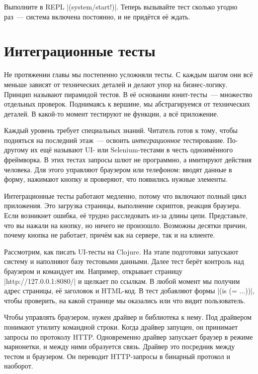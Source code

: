 Выполните в REPL \spverb|(system/start!)|. Теперь вызывайте тест сколько угодно
раз~--- система включена постоянно, и не прид\"{е}тся е\"{е} ждать.

\section{Интеграционные тесты}


Не протяжении главы мы постепенно усложняли тесты. С каждым шагом они вс\"{е}
меньше зависят от технических деталей и делают упор на бизнес-логику. Принцип
называют пирамидой тестов.
В е\"{е} основании юнит-тесты~--- множество отдельных проверок. Поднимаясь к вершине,
мы абстрагируемся от технических деталей. В какой-то момент тестируют не функции,
а вс\"{е} приложение.


Каждый уровень требует специальных знаний. Читатель готов к тому, чтобы
подняться на последний этаж~--- освоить \emph{интеграционное}
тестирование. По-другому их ещ\"{е} называют UI- или Selenium-тестами в честь
одноим\"{е}нного фреймворка. В этих тестах запросы шлют не программно, а имитируют действия
человека. Для этого управляют браузером или телефоном: вводят данные в форму,
нажимают кнопку и проверяют, что появились нужные элементы.

Интеграционные тесты работают медленно, потому что включают полный цикл
приложения. Это загрузка страницы, выполнение скриптов, реакция браузера. Если
возникнет ошибка, е\"{е} трудно расследовать из-за длины цепи. Представьте, что вы
нажали на кнопку, но ничего не произошло. Возможны десятки причин, почему кнопка
не работает, прич\"{е}м как на сервере, так и на клиенте.

Рассмотрим, как писать UI-тесты на Clojure. На этапе подготовки запускают
систему и наполняют базу тестовыми данными. Далее тест бер\"{е}т контроль над
браузером и командует им. Например, открывает страницу \spverb|http://127.0.0.1:8080/|
и щелкает по ссылкам. В любой момент мы получим адрес страницы, е\"{е} заголовок
и HTML-код. В тест добавляют формы \spverb|(is (= ...))|, чтобы проверить,
на какой странице мы оказались или что видит пользователь.


Чтобы управлять браузером, нужен драйвер и библиотека к нему. Под драйвером
понимают утилиту командной строки. Когда драйвер запущен, он принимает запросы
по протоколу HTTP. Одновременно драйвер запускает браузер в режиме марионетки, и
между ними образуется связь. Драйвер это посредник между тестом и браузером. Он
переводит HTTP-запросы в бинарный протокол и наоборот.

